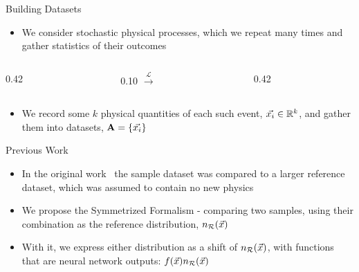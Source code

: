 \documentclass[notheorems]{beamer}
\begin{document}
\begin{frame}{Building Datasets}
    \begin{itemize}
        \item We consider stochastic physical processes, which we repeat many times and gather statistics of their outcomes
    \end{itemize}

    \begin{center}
    \begin{columns}[c]

        \begin{column}{0.42\textwidth}
            \centering
        \end{column}

        \begin{column}{0.10\textwidth}
            \centering
            {\Huge $\xrightarrow{\mathcal{L}}$}
        \end{column}

        \begin{column}{0.42\textwidth}
            \centering
        \end{column}

    \end{columns}
    \end{center}
    \begin{itemize}
        \item We record some $k$ physical quantities of each such event, ${\vec{{x}_i}} \in \mathbb{R}^k$, and gather them into datasets, ${\mathbf{A}} = \{{\vec{{x}_i}}\}$
    \end{itemize}
\end{frame}

\begin{frame}{Previous Work}
    \begin{itemize}
        \item In the original work~ the sample dataset was compared to a larger reference dataset, which was assumed to contain no new physics
        \item We propose the Symmetrized Formalism - comparing two samples, using their combination as the reference distribution, $n_{\mathcal{R}}({\vec{{x}}})$
        \item With it, we express either distribution as a shift of $n_{\mathcal{R}}({\vec{{x}}})$, with functions that are neural network outputs: $f(\vec{{x}}) n_{\mathcal{R}}({\vec{{x}}})$
    \end{itemize}
\end{frame}
\end{document}
